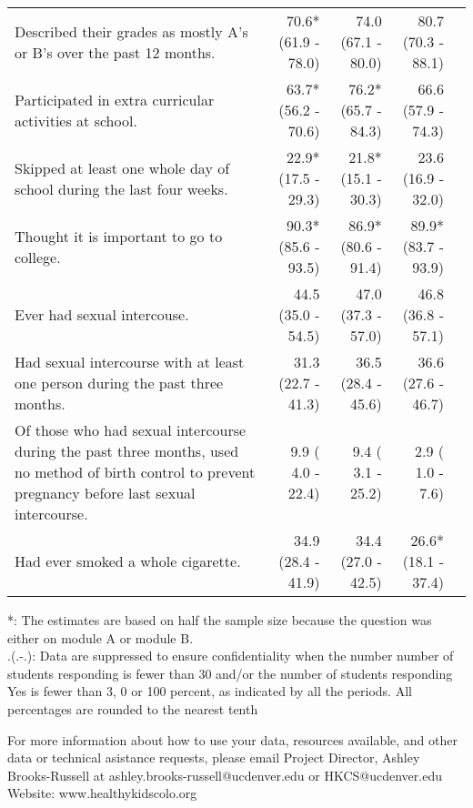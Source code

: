 \documentclass[11pt]{article}
\begin{document}
\begin{longtable}{p{12cm}|rrr|r}
  Described their grades as mostly A's or B's over the past 12 months. & 70.6*(61.9 - 78.0) & 74.0 (67.1 - 80.0) & 80.7 (70.3 - 88.1) &  \\ 
  Participated in extra curricular activities at school. & 63.7*(56.2 - 70.6) & 76.2*(65.7 - 84.3) & 66.6 (57.9 - 74.3) &  \\ 
  Skipped at least one whole day of school during the last four weeks. & 22.9*(17.5 - 29.3) & 21.8*(15.1 - 30.3) & 23.6 (16.9 - 32.0) &  \\ 
  Thought it is important to go to college. & 90.3*(85.6 - 93.5) & 86.9*(80.6 - 91.4) & 89.9*(83.7 - 93.9) &  \\ 
  Ever had sexual intercouse. & 44.5 (35.0 - 54.5) & 47.0 (37.3 - 57.0) & 46.8 (36.8 - 57.1) &  \\ 
  Had sexual intercourse with at least one person during the past three months. & 31.3 (22.7 - 41.3) & 36.5 (28.4 - 45.6) & 36.6 (27.6 - 46.7) &  \\ 
  Of those who had sexual intercourse during the past three months, used no method of birth control to prevent pregnancy before last sexual intercourse. &  9.9 ( 4.0 - 22.4) &  9.4 ( 3.1 - 25.2) &  2.9 ( 1.0 -  7.6) &  \\ 
  Had ever smoked a whole cigarette. & 34.9 (28.4 - 41.9) & 34.4 (27.0 - 42.5) & 26.6*(18.1 - 37.4) &  \\ 
  \hline
\end{longtable}\vspace{-0.4cm}
\begin{footnotesize}
*: The estimates are based on half the sample size because the question was either on module A or module B. \\
 .(.-.): Data are suppressed to ensure confidentiality when the number number of students responding is fewer than 30 and/or the number of students responding Yes is fewer than 3, 0 or 100 percent, as indicated by all the periods. All percentages are rounded to the nearest tenth\\
\end{footnotesize}

\noindent For more information about how to use your data, resources available, and other data or technical asistance requests, please email Project Director, Ashley Brooks-Russell at ashley.brooks-russell@ucdenver.edu or HKCS@ucdenver.edu
\\
\noindent Website: www.healthykidscolo.org
\end{document}
